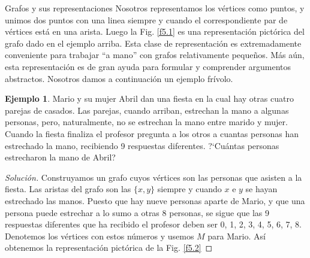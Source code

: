 \documentclass[11pt,spanish,makeidx]{amsbook}
\theoremstyle{definition}
\newtheorem{ejemplo}{Ejemplo}[section]
\theoremstyle{remark}
\begin{document}
\begin{section}{Grafos y sus representaciones}
Nosotros representamos los vértices como puntos, y unimos dos puntos con una linea siempre y cuando el correspondiente par de vértices está en una arista. Luego la Fig. \ref{f5.1} es una representación pictórica del grafo dado en el ejemplo arriba. Esta clase de representación es extremadamente conveniente para trabajar ``a mano'' con grafos relativamente pequeños. Más aún, esta representación es de gran ayuda para formular y comprender argumentos abstractos. Nosotros damos a continuación un ejemplo frívolo.

\begin{ejemplo} Mario y su mujer Abril dan una fiesta en la cual hay otras cuatro parejas de casados. Las parejas, cuando arriban, estrechan la mano a algunas personas, pero, naturalmente, no se estrechan la mano entre marido y mujer. Cuando la fiesta finaliza el profesor pregunta a los otros a cuantas personas han estrechado la mano, recibiendo 9 respuestas diferentes. ?`Cuántas personas estrecharon la mano de Abril?
\end{ejemplo}
\begin{proof}[Solución] Construyamos un grafo cuyos vértices son las personas que asisten a la fiesta. Las aristas del grafo son las  $\{x,y\}$ siempre y cuando $x$ e $y$ se hayan estrechado las manos. Puesto que hay nueve personas aparte de Mario, y que una persona puede estrechar a lo sumo a otras 8 personas, se sigue que las 9 respuestas diferentes que ha recibido el profesor deben ser 0, 1, 2, 3, 4, 5, 6, 7, 8. Denotemos los vértices con estos números y usemos $M$ para Mario. Así obtenemos la representación pictórica de la Fig. \ref{f5.2}


\end{proof}
\end{section}
\end{document}
